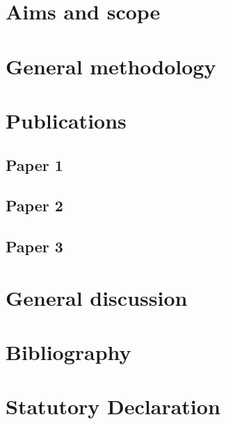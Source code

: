 \documentclass[12pt]{report}
\begin{document}
    \chapter{Aims and scope}

    \chapter{General methodology}

    \chapter{Publications}
        \section{Paper 1}

        \section{Paper 2}

        \section{Paper 3}

    \chapter{General discussion}

    \chapter{Bibliography}

    \chapter{Statutory Declaration}
\end{document}
